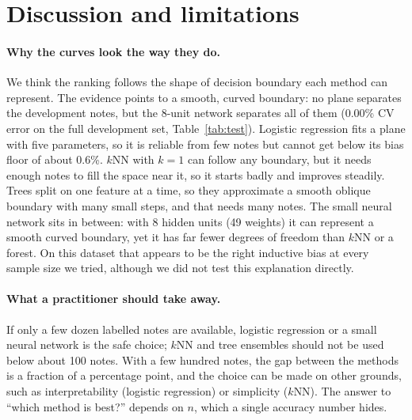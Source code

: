 \section{Discussion and limitations}
\label{sec:discussion}
\paragraph{Why the curves look the way they do.} We think the ranking follows the shape of decision boundary each method can represent. The evidence points to a smooth, curved boundary: no plane separates the development notes, but the 8-unit network separates all of them (0.00\% CV error on the full development set, Table~\ref{tab:test}). Logistic regression fits a plane with five parameters, so it is reliable from few notes but cannot get below its bias floor of about 0.6\%. $k$NN with $k=1$ can follow any boundary, but it needs enough notes to fill the space near it, so it starts badly and improves steadily. Trees split on one feature at a time, so they approximate a smooth oblique boundary with many small steps, and that needs many notes. The small neural network sits in between: with 8 hidden units (49 weights) it can represent a smooth curved boundary, yet it has far fewer degrees of freedom than $k$NN or a forest. On this dataset that appears to be the right inductive bias at every sample size we tried, although we did not test this explanation directly.

\paragraph{What a practitioner should take away.} If only a few dozen labelled notes are available, logistic regression or a small neural network is the safe choice; $k$NN and tree ensembles should not be used below about 100 notes. With a few hundred notes, the gap between the methods is a fraction of a percentage point, and the choice can be made on other grounds, such as interpretability (logistic regression) or simplicity ($k$NN). The answer to ``which method is best?'' depends on $n$, which a single accuracy number hides.

